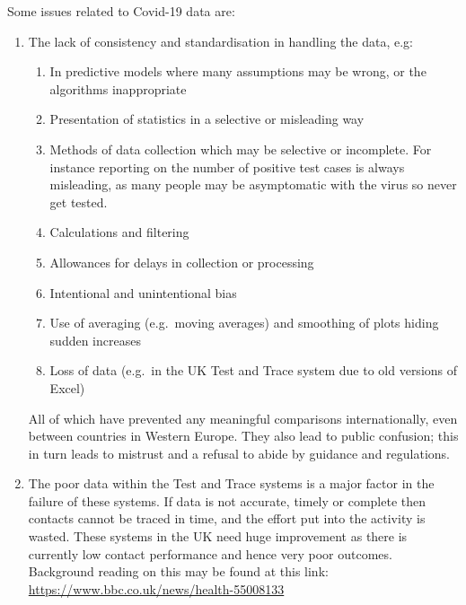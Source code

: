 Some issues related to Covid-19 data are:
\begin{enumerate}
\item The lack of \gls{consistency} and standardisation in handling the data, e.g:
  \begin{enumerate}[label=\color{dsiwgAccentColour}{\alph*.}]
  \item In predictive models where many assumptions may be wrong, or the algorithms inappropriate
  \item Presentation of statistics in a selective or misleading way
  \item Methods of data collection which may be selective or incomplete. For instance reporting on the number of positive test cases is always misleading, as many people may be asymptomatic with the virus so never get tested.
  \item Calculations and filtering
  \item Allowances for delays in collection or processing
  \item Intentional and unintentional bias
  \item Use of averaging (e.g.\ moving averages) and smoothing of plots hiding sudden increases
  \item Loss of data (e.g.\ in the UK Test and Trace system due to old versions of Excel)
  \end{enumerate}
All of which have prevented any meaningful comparisons internationally, even between countries in Western Europe. They also lead to public confusion; this in turn leads to mistrust and a refusal to abide by guidance and regulations. 

\item The poor data within the Test and Trace systems is a major factor in the failure of these systems. If data is not accurate, timely or complete then contacts cannot be traced in time, and the effort put into the activity is wasted. These systems in the UK need huge improvement as there is currently low contact performance and hence very poor outcomes. Background reading on this may be found at this link: \href{https://www.bbc.co.uk/news/health-55008133}{https://www.bbc.co.uk/news/health-55008133}
\end{enumerate}

